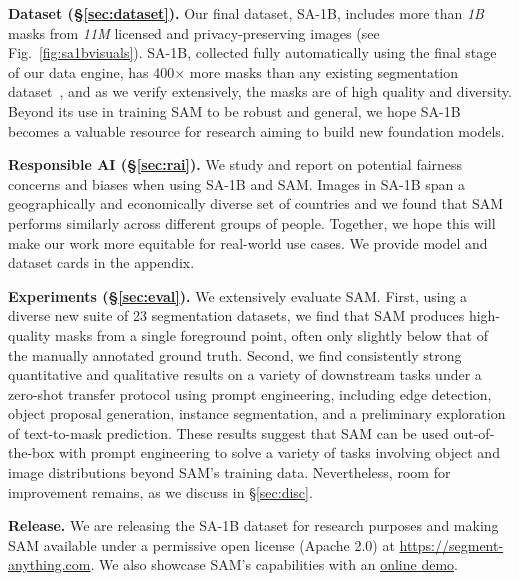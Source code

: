 \documentclass[10pt,twocolumn,letterpaper]{article}
\renewcommand{\paragraph}[1]{\vspace{1.25mm}\noindent\textbf{#1}}
\newcommand{\x}{{\times}}
\newcommand{\sad}{\mbox{SA-1B}\xspace}
\newcommand{\sam}{SAM\xspace}
\newcommand{\fig}[1]{Fig.~\ref{#1}}
\newcommand{\supp}{appendix\xspace}
\begin{document}
\paragraph{Dataset (\S\ref{sec:dataset}).} Our final dataset, \sad, includes more than \emph{1B} masks from \emph{11M} licensed and privacy-preserving images (see \fig{fig:sa1bvisuals}). \sad, collected fully automatically using the final stage of our data engine, has 400$\x$ more masks than any existing segmentation dataset~\cite{Lin2014,Gupta2019,Zhou2019,OpenImages}, and as we verify extensively, the masks are of high quality and diversity. Beyond its use in training \sam to be robust and general, we hope \sad becomes a valuable resource for research aiming to build new foundation models.

\paragraph{Responsible AI (\S\ref{sec:rai}).} We study and report on potential fairness concerns and biases when using \sad and \sam. Images in \sad span a geographically and economically diverse set of countries and we found that \sam performs similarly across different groups of people. Together, we hope this will make our work more equitable for real-world use cases. We provide model and dataset cards in the \supp.

\paragraph{Experiments (\S\ref{sec:eval}).} We extensively evaluate \sam. First, using a diverse new suite of 23 segmentation datasets, we find that \sam produces high-quality masks from a single foreground point, often only slightly below that of the manually annotated ground truth. Second, we find consistently strong quantitative and qualitative results on a variety of downstream tasks under a zero-shot transfer protocol using prompt engineering, including edge detection, object proposal generation, instance segmentation, and a preliminary exploration of text-to-mask prediction. These results suggest that \sam can be used out-of-the-box with prompt engineering to solve a variety of tasks involving object and image distributions beyond \sam's training data. Nevertheless, room for improvement remains, as we discuss in \S\ref{sec:disc}.

\paragraph{Release.} We are releasing the \sad dataset for research purposes and making \sam available under a permissive open license (Apache 2.0) at \href{https://segment-anything.com}{https://segment-anything.com}. We also showcase \sam's capabilities with an \href{https://segment-anything.com/demo}{online demo}.
\end{document}
